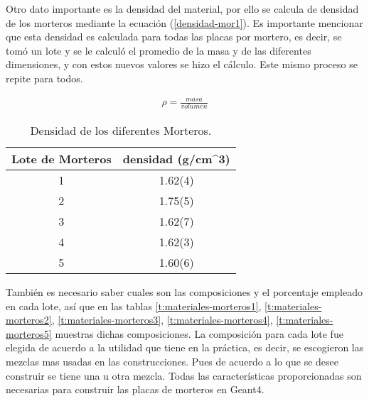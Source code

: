  Otro dato importante es la densidad del material, por ello se calcula de densidad de los morteros mediante la ecuación (\ref{densidad-mor1}).  Es importante mencionar que esta densidad es calculada para todas las placas por mortero, es decir, se tomó un lote y se le calculó el promedio de la masa y de las diferentes dimensiones, y con estos nuevos valores se hizo el cálculo. Este mismo proceso se repite para todos.

\begin{equation} \label{densidad-mor1}
    \begin{split}
	    \rho=\frac{masa}{volumen}
	\end{split}
\end{equation}

\begin{table}[H]
    \begin{center}
        \begin{tabular}{| c | c | }
            \hline
            Lote de Morteros & densidad (g/cm^3) \\ \hline
            1 & 1.62(4)  \\
            2 & 1.75(5) \\
            3 & 1.62(7) \\
            4 & 1.62(3) \\
            5 & 1.60(6) \\ \hline
        \end{tabular}
    \caption{Densidad de los diferentes Morteros.}
    \label{t:densi-morteros}
\end{center}
\end{table} 


También es necesario saber cuales son las composiciones y el porcentaje empleado en cada lote, así que en las tablas \ref{t:materiales-morteros1}, \ref{t:materiales-morteros2}, \ref{t:materiales-morteros3}, \ref{t:materiales-morteros4}, \ref{t:materiales-morteros5} muestras dichas composiciones. La composición para cada lote fue elegida de acuerdo a la utilidad que tiene en la práctica, es decir, se escogieron las mezclas mas usadas en las construcciones. Pues de acuerdo a lo que se desee construir se tiene una u otra mezcla. Todas las características proporcionadas son necesarias para construir las placas de morteros en Geant4.


